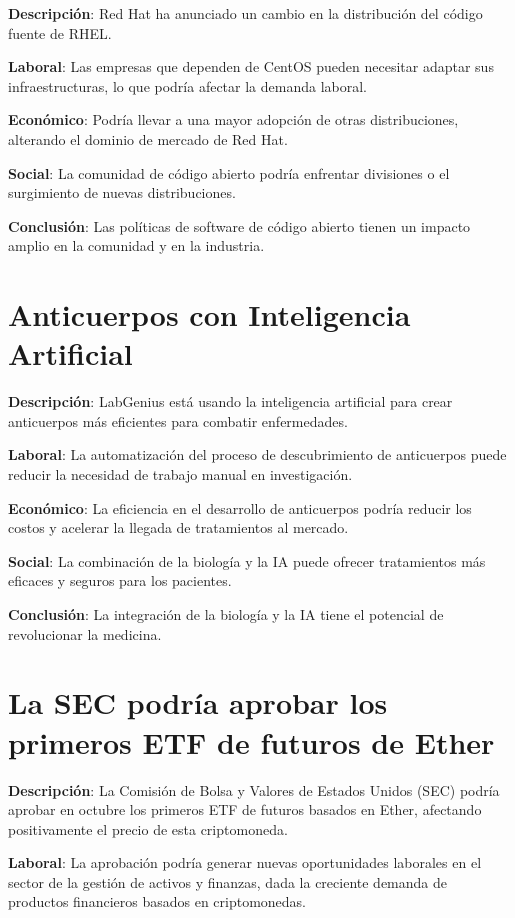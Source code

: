 \documentclass{article}
\begin{document}
\textbf{Descripción}: Red Hat ha anunciado un cambio en la distribución del código fuente de RHEL.

\textbf{Laboral}: Las empresas que dependen de CentOS pueden necesitar adaptar sus infraestructuras, lo que podría afectar la demanda laboral.

\textbf{Económico}: Podría llevar a una mayor adopción de otras distribuciones, alterando el dominio de mercado de Red Hat.

\textbf{Social}: La comunidad de código abierto podría enfrentar divisiones o el surgimiento de nuevas distribuciones.

\textbf{Conclusión}: Las políticas de software de código abierto tienen un impacto amplio en la comunidad y en la industria.

\section*{Anticuerpos con Inteligencia Artificial}

\textbf{Descripción}: LabGenius está usando la inteligencia artificial para crear anticuerpos más eficientes para combatir enfermedades.

\textbf{Laboral}: La automatización del proceso de descubrimiento de anticuerpos puede reducir la necesidad de trabajo manual en investigación.

\textbf{Económico}: La eficiencia en el desarrollo de anticuerpos podría reducir los costos y acelerar la llegada de tratamientos al mercado.

\textbf{Social}: La combinación de la biología y la IA puede ofrecer tratamientos más eficaces y seguros para los pacientes.

\textbf{Conclusión}: La integración de la biología y la IA tiene el potencial de revolucionar la medicina.

\section*{La SEC podría aprobar los primeros ETF de futuros de Ether}

\textbf{Descripción}: La Comisión de Bolsa y Valores de Estados Unidos (SEC) podría aprobar en octubre los primeros ETF de futuros basados en Ether, afectando positivamente el precio de esta criptomoneda.

\textbf{Laboral}: La aprobación podría generar nuevas oportunidades laborales en el sector de la gestión de activos y finanzas, dada la creciente demanda de productos financieros basados en criptomonedas.
\end{document}
